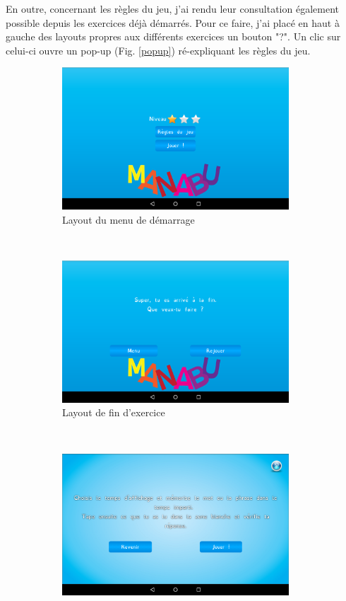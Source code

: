 En outre, concernant les règles du jeu, j'ai rendu leur consultation également possible depuis les exercices déjà démarrés. Pour ce faire, j'ai placé en haut à gauche des layouts propres aux différents exercices un bouton "?". Un clic sur celui-ci ouvre un pop-up (Fig. \ref{popup}) ré-expliquant les règles du jeu.\\

\begin{figure}[H]
\centering
\begin{subfigure}[t]{8.5cm}
\includegraphics[width=8.5cm]{img/layout-debut.png}
\caption{Layout du menu de démarrage}
\label{dem}
\end{subfigure}
~
\begin{subfigure}[t]{8.5cm}
\includegraphics[width=8.5cm]{img/layout-fin.png}
\caption{Layout de fin d'exercice}
\label{fin}
\end{subfigure}
~
\begin{subfigure}[t]{8.5cm}
\includegraphics[width=8.5cm]{img/layout-regles.png}

\end{subfigure}
\end{figure}
